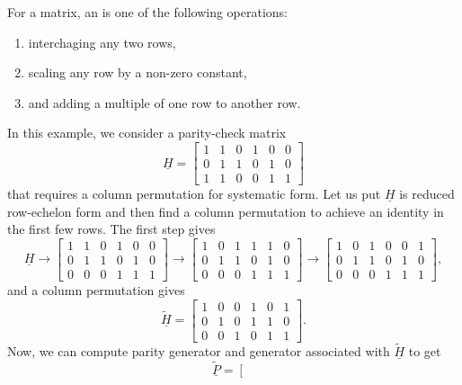 \begin{definition}
For a matrix, an  is one of the following operations:
\begin{enumerate}
\item interchaging any two rows,
\item scaling any row by a non-zero constant,
\item and adding a multiple of one row to another row.
\end{enumerate}
\end{definition}

\begin{example}
In this example, we consider a parity-check matrix
\[ \underline{H} =\left[\begin{array}{cccccc}
1 & 1 & 0 & 1 & 0 & 0\\
0 & 1 & 1 & 0 & 1 & 0\\
1 & 1 & 0 & 0 & 1 & 1\end{array}\right] \]
that requires a column permutation for systematic form.
Let us put $\underline{H}$ is reduced row-echelon form and then find a column permutation to achieve an identity in the first few rows.
The first step gives
\[ \underline{H} \rightarrow\left[\begin{array}{cccccc}
1 & 1 & 0 & 1 & 0 & 0\\
0 & 1 & 1 & 0 & 1 & 0\\
0 & 0 & 0 & 1 & 1 & 1\end{array}\right]\rightarrow\left[\begin{array}{cccccc}
1 & 0 & 1 & 1 & 1 & 0\\
0 & 1 & 1 & 0 & 1 & 0\\
0 & 0 & 0 & 1 & 1 & 1\end{array}\right]
\rightarrow\left[\begin{array}{cccccc}
1 & 0 & 1 & 0 & 0 & 1\\
0 & 1 & 1 & 0 & 1 & 0\\
0 & 0 & 0 & 1 & 1 & 1\end{array}\right], \]
and a column permutation gives
\[ \tilde{\underline{H}}=\left[\begin{array}{cccccc}
1 & 0 & 0 & 1 & 0 & 1\\
0 & 1 & 0 & 1 & 1 & 0\\
0 & 0 & 1 & 0 & 1 & 1\end{array}\right]. \]
Now, we can compute parity generator and generator associated with $\tilde{\underline{H}}$ to get
\[ \tilde{\underline{P}}=\left[\begin{array}{ccc}

\end{array}\]
\end{example}
